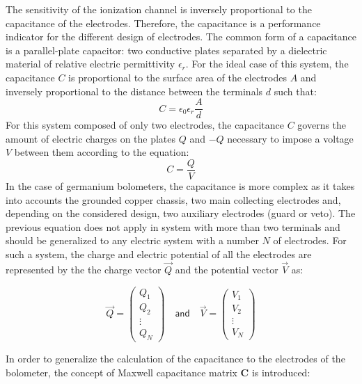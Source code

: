 The sensitivity of the ionization channel is inversely proportional to the capacitance of the electrodes. Therefore, the capacitance is a performance indicator for the different design of electrodes.
The common form of a capacitance is a parallel-plate capacitor: two conductive plates separated by a dielectric material of relative electric permittivity $\epsilon_r$. For the ideal case of this system, the capacitance $C$ is proportional to the surface area of the electrodes $A$ and inversely proportional to the distance between the terminals $d$ such that:
\begin{equation}
C = \epsilon_0 \epsilon_r \frac{A}{d}
\end{equation}
For this system composed of only two electrodes, the capacitance $C$ governs the amount of electric charges on the plates $Q$ and $-Q$ necessary to impose a voltage $V$ between them according to the equation:
 \begin{equation}
 \label{eq:capacitance-definition-simple}
C = \frac{Q}{V}
\end{equation}
In the case of germanium bolometers, the capacitance is more complex as it takes into accounts the grounded copper chassis, two main collecting electrodes and, depending on the considered design, two auxiliary electrodes (guard or veto). The previous equation does not apply in system with more than two terminals and should be generalized to any electric system with a number $N$ of electrodes. For such a system, the charge and electric potential of all the electrodes are represented by the the charge vector $\vec{Q}$ and the potential vector $\vec{V}$ as:

\begin{equation} 
\label{eq:vector-charge-potential}
\vec{Q} = 
\begin{pmatrix}
Q_{1} \\ 
Q_{2} \\ 
\vdots \\ 
Q_{N}
\end{pmatrix} 
\quad \textsf{and} \quad
\vec{V} = 
\begin{pmatrix}
V_{1} \\ 
V_{2} \\ 
\vdots \\
V_{N}
\end{pmatrix} 
\end{equation}

In order to generalize the calculation of the capacitance to the electrodes of the bolometer, the concept of Maxwell capacitance matrix $\bm{C}$ is introduced:

